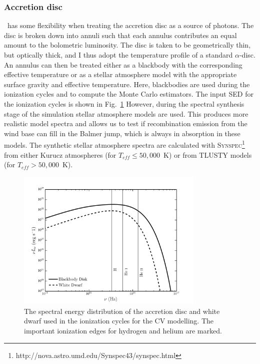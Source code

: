 \subsubsection{Accretion disc}

\py\ has some flexibility when treating the accretion 
disc as a source of photons. The disc is broken down into annuli 
such that each annulus contributes an equal amount to the bolometric
luminosity. The disc is taken to be geometrically thin, but optically
thick, and I thus adopt the temperature profile of a standard
\cite{shakurasunyaev1973} $\alpha$-disc. An annulus can then
be treated either as a blackbody with the corresponding effective
temperature or as a stellar atmosphere model with the appropriate
surface gravity and effective temperature. Here, blackbodies are used
during the ionization cycles and to compute the Monte Carlo
estimators. The input SED for the ionization cycles is shown in 
Fig.~\ref{cv_model_sed}
However, during the spectral synthesis stage of the 
simulation stellar atmosphere models are used. This produces more
realistic model spectra and allows us to test if recombination
emission from the wind base can fill in the Balmer jump, which is
always in absorption in these models. The synthetic stellar atmosphere
spectra are calculated with
\textsc{Synspec}\footnote{http://nova.astro.umd.edu/Synspec43/synspec.html}
from either Kurucz \citep{kurucz1991} atmospheres (for $T_{eff} \leq
50,000$~K) or from \textsc{TLUSTY} \citep{tlusty} models (for $T_{eff} > 50,000$~K). 

\begin{figure} 
\centering
\includegraphics[width=0.8\textwidth]{figures/05-cvpaper/sed.png}
\caption{The spectral energy distribution of the 
accretion disc and white dwarf used in the ionization cycles for
the CV modelling. The important ionization edges for
hydrogen and helium are marked.}
\label{cv_model_sed}
\end{figure} 

